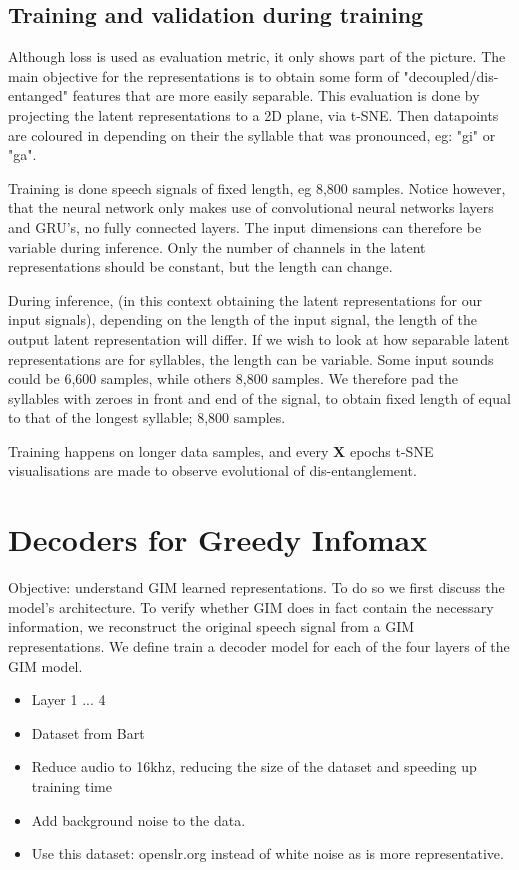 \subsection{Training and validation during training}
Although loss is used as evaluation metric, it only shows part of the picture. The main objective for the representations is to obtain some form of "decoupled/dis-entanged" features that are more easily separable. This evaluation is done by projecting the latent representations to a 2D plane, via t-SNE.
Then datapoints are coloured in depending on their the syllable that was pronounced, eg: "gi" or "ga".

Training is done speech signals of fixed length, eg 8,800 samples. Notice however, that the neural network only makes use of convolutional neural networks layers and GRU's, no fully connected layers. The input dimensions can therefore be variable during inference. Only the number of channels in the latent representations should be constant, but the length can change.

During inference, (in this context obtaining the latent representations for our input signals), depending on the length of the input signal, the length of the output latent representation will differ.
If we wish to look at how separable latent representations are for syllables, the length can be variable. Some input sounds could be 6,600 samples, while others 8,800 samples. We therefore pad the syllables with zeroes in front and end of the signal, to obtain fixed length of equal to that of the longest syllable; 8,800 samples.

Training happens on longer data samples, and every \textbf{X} epochs t-SNE visualisations are made to observe evolutional of dis-entanglement.




\section{Decoders for Greedy Infomax}
Objective: understand GIM learned representations. To do so we first discuss the model's architecture. To verify whether GIM does in fact contain the necessary information, we reconstruct the original speech signal from a GIM representations. We define train a decoder model for each of the four layers of the GIM model.

\begin{itemize}
	\item Layer 1 ... 4
	\item Dataset from Bart
	\item Reduce audio to 16khz, reducing the size of the dataset and speeding up training time
	\item Add background noise to the data.
	\item Use this dataset: openslr.org instead of white noise as is more representative.
\end{itemize}







